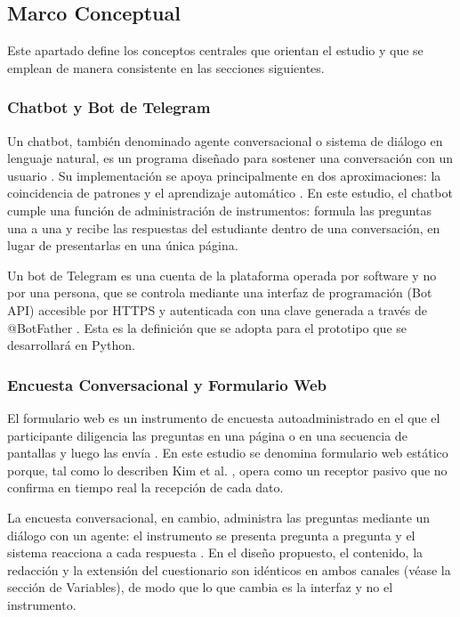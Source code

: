 \documentclass[12pt,letterpaper]{article}
\begin{document}
\subsection{Marco Conceptual}

Este apartado define los conceptos centrales que orientan el estudio y que se emplean de manera consistente en las secciones siguientes.

\subsubsection{Chatbot y Bot de Telegram}
 
Un chatbot, también denominado agente conversacional o sistema de diálogo en lenguaje natural, es un programa diseñado para sostener una conversación con un usuario \cite{adamopoulou2020}. Su implementación se apoya principalmente en dos aproximaciones: la coincidencia de patrones y el aprendizaje automático \cite{adamopoulou2020}. En este estudio, el chatbot cumple una función de administración de instrumentos: formula las preguntas una a una y recibe las respuestas del estudiante dentro de una conversación, en lugar de presentarlas en una única página.
 
Un bot de Telegram es una cuenta de la plataforma operada por software y no por una persona, que se controla mediante una interfaz de programación (Bot API) accesible por HTTPS y autenticada con una clave generada a través de @BotFather \cite{telegram2015}. Esta es la definición que se adopta para el prototipo que se desarrollará en Python.

\subsubsection{Encuesta Conversacional y Formulario Web}
 
El formulario web es un instrumento de encuesta autoadministrado en el que el participante diligencia las preguntas en una página o en una secuencia de pantallas y luego las envía \cite{couper2000}. En este estudio se denomina formulario web estático porque, tal como lo describen Kim et al. \cite{kim2019}, opera como un receptor pasivo que no confirma en tiempo real la recepción de cada dato.
 
La encuesta conversacional, en cambio, administra las preguntas mediante un diálogo con un agente: el instrumento se presenta pregunta a pregunta y el sistema reacciona a cada respuesta \cite{kim2019, xiao2020}. En el diseño propuesto, el contenido, la redacción y la extensión del cuestionario son idénticos en ambos canales (véase la sección de Variables), de modo que lo que cambia es la interfaz y no el instrumento.
 
\end{document}

